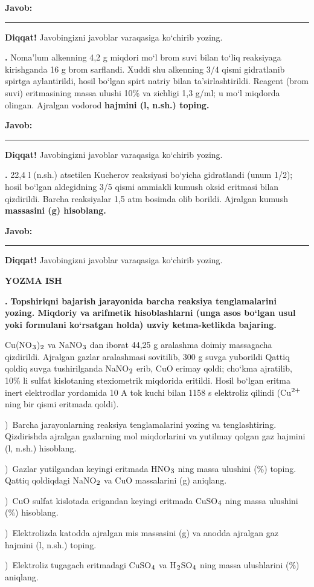 \documentclass[11pt,a4paper]{article}
\renewcommand{\textsubscript}[1]{\ensuremath{_{\text{\fontsize{8}{8}\selectfont #1}}}}
\renewcommand{\textsuperscript}[1]{\ensuremath{^{\text{\fontsize{8}{8}\selectfont #1}}}}
\newcommand{\qn}[1]{\textbf{\fontsize{11.5}{13}\selectfont #1}}
\newcommand{\qsep}{\par\vspace{13pt}}
\newcommand{\javob}{\par\nopagebreak[4]\smallskip\noindent\textbf{Javob:} \rule[-2pt]{7.5cm}{0.4pt}\par\smallskip\noindent\textbf{Diqqat!} Javobingizni javoblar varaqasiga ko`chirib yozing.\par\medskip}
\begin{document}
\javob\qsep
\noindent\qn{39.} Noma'lum alkenning 4,2 g miqdori mo`l brom suvi bilan to`liq reaksiyaga kirishganda 16 g brom sarflandi. Xuddi shu alkenning 3/4 qismi gidratlanib spirtga aylantirildi, hosil bo`lgan spirt natriy bilan ta'sirlashtirildi. Reagent (brom suvi) eritmasining massa ulushi 10\% va zichligi 1,3 g/ml; u mo`l miqdorda olingan. Ajralgan vodorod \textbf{hajmini (l, n.sh.) toping.}
\javob\qsep
\noindent\qn{40.} 22,4 l (n.sh.) atsetilen Kucherov reaksiyasi bo`yicha gidratlandi (unum 1/2); hosil bo`lgan aldegidning 3/5 qismi ammiakli kumush oksid eritmasi bilan qizdirildi. Barcha reaksiyalar 1,5 atm bosimda olib borildi. Ajralgan kumush \textbf{massasini (g) hisoblang.}
\javob\qsep
\par\bigskip\begin{center}\textbf{\fontsize{13}{15}\selectfont YOZMA ISH}\end{center}
\noindent\qn{41.} \textbf{Topshiriqni bajarish jarayonida barcha reaksiya tenglamalarini yozing. Miqdoriy va arifmetik hisoblashlarni (unga asos bo`lgan usul yoki formulani ko`rsatgan holda) uzviy ketma-ketlikda bajaring.}\par\smallskip
Cu(NO\textsubscript{3})\textsubscript{2} va NaNO\textsubscript{3} dan iborat 44,25 g aralashma doimiy massagacha qizdirildi. Ajralgan gazlar aralashmasi sovitilib, 300 g suvga yuborildi Qattiq qoldiq suvga tushirilganda NaNO\textsubscript{2} erib, CuO erimay qoldi; cho`kma ajratilib, 10\% li sulfat kislotaning stexiometrik miqdorida eritildi. Hosil bo`lgan eritma inert elektrodlar yordamida 10 A tok kuchi bilan 1158 s elektroliz qilindi (Cu\textsuperscript{2+} ning bir qismi eritmada qoldi).\par
{})\ Barcha jarayonlarning reaksiya tenglamalarini yozing va tenglashtiring. Qizdirishda ajralgan gazlarning mol miqdorlarini va yutilmay qolgan gaz hajmini (l, n.sh.) hisoblang.\par
{})\ Gazlar yutilgandan keyingi eritmada HNO\textsubscript{3} ning massa ulushini (\%) toping. Qattiq qoldiqdagi NaNO\textsubscript{2} va CuO massalarini (g) aniqlang.\par
{})\ CuO sulfat kislotada erigandan keyingi eritmada CuSO\textsubscript{4} ning massa ulushini (\%) hisoblang.\par
{})\ Elektrolizda katodda ajralgan mis massasini (g) va anodda ajralgan gaz hajmini (l, n.sh.) toping.\par
{})\ Elektroliz tugagach eritmadagi CuSO\textsubscript{4} va H\textsubscript{2}SO\textsubscript{4} ning massa ulushlarini (\%) aniqlang.\par
\end{document}
